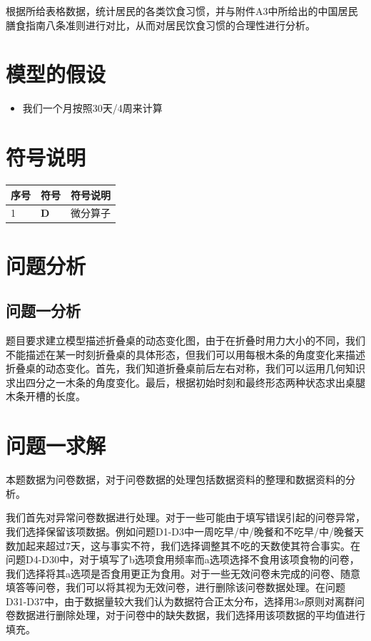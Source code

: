 \documentclass{cumcmthesis}
\begin{document}
根据所给表格数据，统计居民的各类饮食习惯，并与附件A3中所给出的中国居民膳食指南八条准则进行对比，从而对居民饮食习惯的合理性进行分析。


\section{模型的假设}

\begin{itemize}
\item 我们一个月按照30天/4周来计算
\end{itemize}

\section{符号说明}
\begin{table}[h!]
  \centering
  \small
  \begin{tabular}{p{60pt}<{\centering}|p{60pt}<{\centering}p{180pt}<{\raggedright}}
   \hline
    序号 & 符号 & 符号说明 \\
   \hline
    1 & $\mathbf{D}$ & 微分算子 \\
    \hline
  \end{tabular}
  \label{symbol}
\end{table}
\section{问题分析}

\subsection{问题一分析}
题目要求建立模型描述折叠桌的动态变化图，由于在折叠时用力大小的不同，我们不能描述在某一时刻折叠桌的具体形态，但我们可以用每根木条的角度变化来描述折叠桌的动态变化。首先，我们知道折叠桌前后左右对称，我们可以运用几何知识求出四分之一木条的角度变化。最后，根据初始时刻和最终形态两种状态求出桌腿木条开槽的长度。


\section{问题一求解}
本题数据为问卷数据，对于问卷数据的处理包括数据资料的整理和数据资料的分析。

我们首先对异常问卷数据进行处理。对于一些可能由于填写错误引起的问卷异常，我们选择保留该项数据。例如问题D1-D3中一周吃早/中/晚餐和不吃早/中/晚餐天数加起来超过7天，这与事实不符，我们选择调整其不吃的天数使其符合事实。在问题D4-D30中，对于填写了b选项食用频率而a选项选择不食用该项食物的问卷，我们选择将其a选项是否食用更正为食用。对于一些无效问卷未完成的问卷、随意填答等问卷，我们可以将其视为无效问卷，进行删除该问卷数据处理。在问题D31-D37中，由于数据量较大我们认为数据符合正太分布，选择用$3\sigma$原则对离群问卷数据进行删除处理，对于问卷中的缺失数据，我们选择用该项数据的平均值进行填充。
\end{document}
